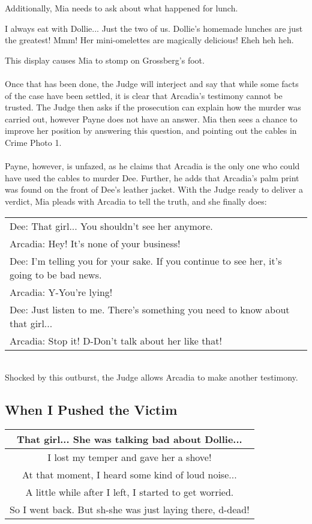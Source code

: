 Additionally, Mia needs to ask about what happened for lunch.
\begin{center}
I always eat with Dollie... Just the two of us. Dollie's homemade lunches are just the greatest! Mmm! Her mini-omelettes are magically delicious! Eheh heh heh.
\end{center}
This display causes Mia to stomp on Grossberg's foot.\\
\\
Once that has been done, the Judge will interject and say that while some facts of the case have been settled, it is clear that Arcadia's testimony cannot be trusted. The Judge then asks if the prosecution can explain how the murder was carried out, however Payne does not have an answer. Mia then sees a chance to improve her position by answering this question, and pointing out the cables in Crime Photo 1. \\
\\
Payne, however, is unfazed, as he claims that Arcadia is the only one who could have used the cables to murder Dee. Further, he adds that Arcadia's palm print was found on the front of Dee's leather jacket. With the Judge ready to deliver a verdict, Mia pleads with Arcadia to tell the truth, and she finally does:\\
\begin{tabular}{l}
Dee: That girl... You shouldn't see her anymore.\\
Arcadia: Hey! It's none of your business! \\
Dee: I'm telling you for your sake. If you continue to see her, it's going to be bad news. \\
Arcadia: Y-You're lying!\\
Dee: Just listen to me. There's something you need to know about that girl...\\
Arcadia: Stop it! D-Don't talk about her like that!\end{tabular}\\
Shocked by this outburst, the Judge allows Arcadia to make another testimony.

\subsection{When I Pushed the Victim}
\begin{tabular}{c}
That girl... She was talking bad about Dollie... \\\hline
I lost my temper and gave her a shove!\\\hline
At that moment, I heard some kind of loud noise...\\\hline
A little while after I left, I started to get worried.\\\hline
So I went back. But sh-she was just laying there, d-dead!\\\hline
\end{tabular}\\

